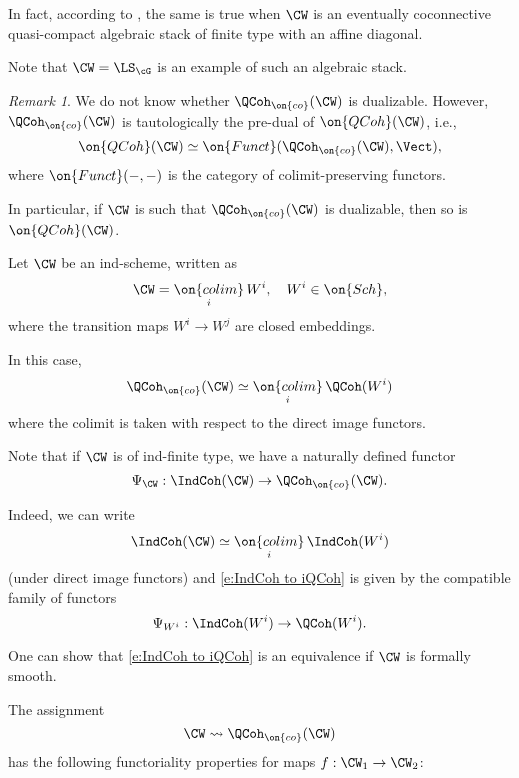 \documentclass[9pt]{amsart}
\theoremstyle{remark}
\newtheorem{rem}[subsubsection]{Remark}
\theoremstyle{definition}
\theoremstyle{remark}
\numberwithin{equation}{section}
\begin{document}
\medskip

In fact, according to \cite[Proposition 6.2.7 and Theorem 2.2.6]{Ga4}, the same is true when $\CW$ is an eventually coconnective 
quasi-compact algebraic stack of finite type with an affine diagonal.

\medskip

Note that $\CW=\LS_\cG$ is an example of such an algebraic stack.

\begin{rem}
We do not know whether $\QCoh_{\on{co}}(\CW)$ is dualizable. However,
$\QCoh_{\on{co}}(\CW)$ is tautologically the pre-dual of $\on{QCoh}(\CW)$, i.e.,
$$\on{QCoh}(\CW)\simeq \on{Funct}(\QCoh_{\on{co}}(\CW),\Vect),$$
where $\on{Funct}(-,-)$ is the category of colimit-preserving functors.

\medskip

In particular, if $\CW$ is such that $\QCoh_{\on{co}}(\CW)$ is dualizable, then so is $\on{QCoh}(\CW)$. 

\end{rem} 

 \label{sss:iQCoh Ind}

Let $\CW$ be an ind-scheme, written as 
$$\CW =\underset{i}{\on{colim}}\, W^i, \quad W^i\in \on{Sch},$$
where the transition maps $W^i\to W^j$ are closed embeddings. 

\medskip

In this case, 
$$\QCoh_{\on{co}}(\CW)\simeq \underset{i}{\on{colim}}\, \QCoh(W^i)$$
where the colimit is taken with respect to the direct image functors.

\medskip

Note that if $\CW$ is of ind-finite type, we
have a naturally defined functor
\begin{equation} \label{e:IndCoh to iQCoh}
\Psi_\CW:\IndCoh(\CW)\to \QCoh_{\on{co}}(\CW).
\end{equation}

Indeed, we can write 
$$\IndCoh(\CW)\simeq \underset{i}{\on{colim}}\, \IndCoh(W^i)$$
(under direct image functors) and \eqref{e:IndCoh to iQCoh} is given by the compatible family of functors 
$$\Psi_{W^i}:\IndCoh(W^i)\to \QCoh(W^i).$$

\medskip

One can show that \eqref{e:IndCoh to iQCoh}
is an equivalence if $\CW$ is formally smooth. 

\sssec{} \label{sss:iQCoh funct}

The assignment
$$\CW\rightsquigarrow \QCoh_{\on{co}}(\CW)$$
has the following functoriality properties for maps $f:\CW_1\to \CW_2$: 
\end{document}
